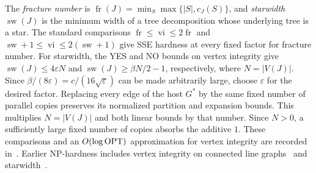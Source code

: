 The \emph{fracture number} is
$\operatorname{fr}(J)=\min_S\max\{|S|,c_J(S)\}$, and
\emph{starwidth} $\operatorname{sw}(J)$ is the minimum width of
a tree decomposition whose underlying tree is a star.
The standard comparisons
$\operatorname{fr}\leq\operatorname{vi}\leq2\operatorname{fr}$ and
$\operatorname{sw}+1\leq\operatorname{vi}\leq2(\operatorname{sw}+1)$
give \textup{SSE} hardness at every fixed factor for fracture number. For
starwidth, the YES and NO bounds on vertex integrity give
$\operatorname{sw}(J)\leq4\varepsilon N$ and
$\operatorname{sw}(J)\geq\beta N/2-1$, respectively, where
$N=|V(J)|$. Since $\beta/(8\varepsilon)=c/(16\sqrt\varepsilon)$
can be made arbitrarily large, choose $\varepsilon$ for the desired
factor. Replacing every edge of the host $G^*$ by the same fixed
number of parallel copies preserves its normalized partition and
expansion bounds. This multiplies $N=|V(J)|$ and both linear bounds
by that number. Since $N>0$, a sufficiently large fixed number of
copies absorbs the additive $1$. These comparisons
and an $O(\log\operatorname{OPT})$ approximation
for vertex integrity are recorded in~\cite[Section 1.3 and Theorem 5.1]{GimaEtAlIntegrity}.
Earlier \textup{NP}-hardness includes vertex integrity on connected line
graphs~\cite[Corollary 4.11]{GimaEtAlIntegrity} and starwidth~\cite{VanEe2017}.

